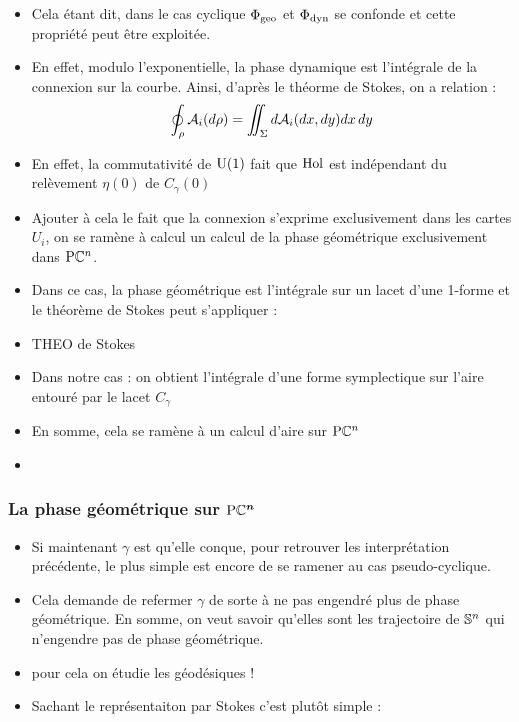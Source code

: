\begin{itemize}
	
	\item Cela étant dit, dans le cas cyclique $\phaseg$ et $\phased$ se confonde et cette propriété peut être exploitée.
	
	\item En effet, modulo l'exponentielle, la phase dynamique est l'intégrale de la connexion sur la courbe. Ainsi, d'après le théorme de Stokes, on a relation :
	\[\oint_\rho \locconn_i(d\rho) = \iint_\Sigma d\locconn_i(dx,dy) dx\,dy\]
	
	\item En effet,  la commutativité de $\U{1}$ fait que $\Hol$ est indépendant du relèvement $\eta(0)$ de $C_\gamma(0)$ 
	
	\item Ajouter à cela le fait que la connexion s'exprime exclusivement dans les cartes $U_i$, on se ramène à calcul un calcul de la phase géométrique exclusivement dans $\PC{n}$.
	
	\item Dans ce cas, la phase géométrique est l'intégrale sur un lacet d'une 1-forme et le théorème de Stokes peut s'appliquer :
	
	\item THEO de Stokes
	
	\item Dans notre cas : on obtient l’intégrale d'une forme symplectique sur l'aire entouré par le lacet $C_\gamma$ 
	
	\item En somme, cela se ramène à un calcul d'aire sur $\PC{n}$
	
	\item {}
	
\end{itemize}




\subsubsection{\todo La phase géométrique sur $\bf{\PC{n}}$}

\begin{itemize}
	
	\item Si maintenant $\gamma$ est qu'elle conque, pour retrouver les interprétation précédente, le plus simple est encore de se ramener au cas pseudo-cyclique.
	
	\item Cela demande de refermer $\gamma$ de sorte à ne pas engendré plus de phase géométrique. En somme, on veut savoir qu'elles sont les trajectoire de $\S{n}$ qui n'engendre pas de phase géométrique.
	
	\item pour cela on étudie les géodésiques !
	
	\item Sachant le représentaiton par Stokes c'est plutôt simple : 
\end{itemize}
